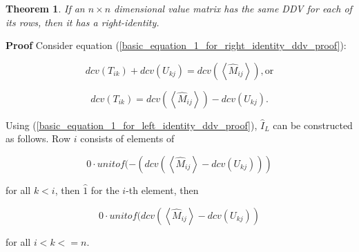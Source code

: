 \documentclass[10pt,letterpaper]{article}
\newtheorem{thm}{Theorem}[section]
\newenvironment{proof}{\noindent\textbf{Proof} }{\qed \newline}
\newcommand{\qed}{\nobreak \ifvmode \relax \else
      \ifdim\lastskip<1.5em \hskip-\lastskip
      \hskip1.5em plus0em minus0.5em \fi \nobreak
      \vrule height0.75em width0.5em depth0.25em\fi}
\numberwithin{equation}{section}
\begin{document}
\begin{thm}If an $n \times n$ dimensional value matrix has the same DDV for each of its rows, then it has a right-identity.\end{thm}

\begin{proof} Consider equation (\ref{basic_equation_1_for_right_identity_ddv_proof}):

\[ dcv(T_{ik}) + dcv(U_{kj}) = dcv( \left\langle \hat M_{ij} \right\rangle ) , \mbox{or} \]

\begin{equation} dcv(T_{ik}) = dcv( \left\langle \hat M_{ij} \right\rangle ) - dcv(U_{kj}) . \end{equation}

Using (\ref{basic_equation_1_for_left_identity_ddv_proof}), $\hat I_L$ can be constructed as follows.  Row $i$ consists of elements of 

\[ 0 \cdot unitof( -(dcv( \left\langle \hat M_{ij} \right\rangle - dcv(U_{kj}))) \]

for all $k < i$, then $\hat 1$ for the $i$-th element, then

\[ 0 \cdot unitof( dcv( \left\langle \hat M_{ij} \right\rangle - dcv(U_{kj})) \]

for all $i < k <= n$. \end{proof}
\end{document}

